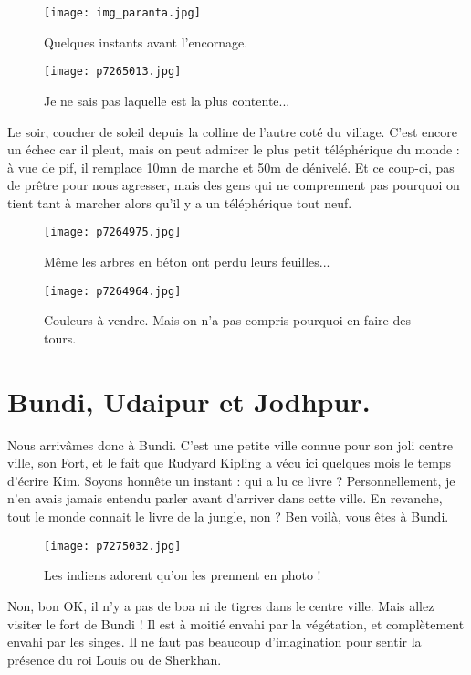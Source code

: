 \documentclass{book}
\begin{document}
\begin{figure}[h]
\centering
\texttt{[image: img\_paranta.jpg]}
\caption*{Quelques instants avant l'encornage.}
\end{figure}


\begin{figure}[h]
\centering
\texttt{[image: p7265013.jpg]}
\caption*{Je ne sais pas laquelle est la plus contente...}
\end{figure}

Le soir, coucher de soleil depuis la colline de l'autre coté du village. C'est encore un échec car il pleut, mais on peut admirer le plus petit téléphérique du monde : à vue de pif, il remplace 10mn de marche et 50m de dénivelé. Et ce coup-ci, pas de prêtre pour nous agresser, mais des gens qui ne comprennent pas pourquoi on tient tant à marcher alors qu'il y a un téléphérique tout neuf.


\begin{figure}[h]
\centering
\texttt{[image: p7264975.jpg]}
\caption*{Même les arbres en béton ont perdu leurs feuilles...}
\end{figure}


\begin{figure}[h]
\centering
\texttt{[image: p7264964.jpg]}
\caption*{Couleurs à vendre. Mais on n'a pas compris pourquoi en faire des tours.}
\end{figure}



\chapter{Bundi, Udaipur et Jodhpur.}
Nous arrivâmes donc à Bundi. C'est une petite ville connue pour son joli centre ville, son Fort, et le fait que Rudyard Kipling a vécu ici quelques mois le temps d'écrire Kim. Soyons honnête un instant : qui a lu ce livre ? Personnellement, je n'en avais jamais entendu parler avant d'arriver dans cette ville. En revanche, tout le monde connait le livre de la jungle, non ? Ben voilà, vous êtes à Bundi.


\begin{figure}[h]
\centering
\texttt{[image: p7275032.jpg]}
\caption*{Les indiens adorent qu'on les prennent en photo !}
\end{figure}

Non, bon OK, il n'y a pas de boa ni de tigres dans le centre ville. Mais allez visiter le fort de Bundi ! Il est à moitié envahi par la végétation, et complètement envahi par les singes. Il ne faut pas beaucoup d'imagination pour sentir la présence du roi Louis ou de Sherkhan.
\end{document}

